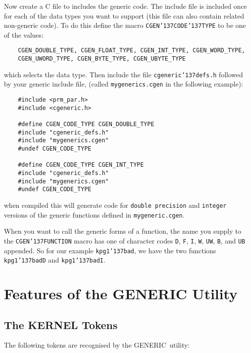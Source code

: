 \documentclass[twoside,11pt]{article}
\renewcommand{\_}{{\tt\char'137}}     %
\newcommand{\GENERIC}{{\footnotesize GENERIC}\normalsize}
\begin{document}
Now create a C file to includes the generic code. The include file is included
once for each of the data types you want to support (this file can also
contain related non-generic code).  To do this define the macro
{\tt CGEN\_CODE\_TYPE} to be one of the values:

\begin{verbatim}
    CGEN_DOUBLE_TYPE, CGEN_FLOAT_TYPE, CGEN_INT_TYPE, CGEN_WORD_TYPE, 
    CGEN_UWORD_TYPE, CGEN_BYTE_TYPE, CGEN_UBYTE_TYPE
\end{verbatim}

which selects the data type. Then include the file {\tt cgeneric\_defs.h}
followed by your generic include file, (called {\tt mygenerics.cgen} in the
following example):

\begin{verbatim}
    #include <prm_par.h>
    #include <cgeneric.h>

    #define CGEN_CODE_TYPE CGEN_DOUBLE_TYPE
    #include "cgeneric_defs.h"
    #include "mygenerics.cgen"
    #undef CGEN_CODE_TYPE

    #define CGEN_CODE_TYPE CGEN_INT_TYPE
    #include "cgeneric_defs.h"
    #include "mygenerics.cgen"
    #undef CGEN_CODE_TYPE
\end{verbatim}

when compiled this will generate code for {\tt double precision}
and {\tt integer} versions of the generic functions defined in
{\tt mygeneric.cgen}.

When you want to call the generic forms of a function, the name you supply to
the {\tt CGEN\_FUNCTION} macro has one of character codes {\tt D}, {\tt F},
{\tt I}, {\tt W}, {\tt UW},  {\tt B}, and {\tt UB} appended.  So for our
example {\tt kpg1\_bad}, we have the two functions {\tt kpg1\_badD} and
{\tt kpg1\_badI}.


\section{Features of the GENERIC Utility}

\subsection{The KERNEL Tokens}

The following tokens are recognised by the \GENERIC\ utility:

\newlength{\numlen}
\settowidth{\numlen}{000000000000}
\settowidth{\labelsep}{000}
\end{document}
